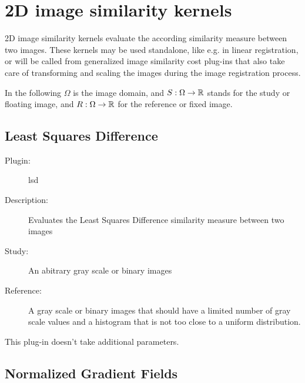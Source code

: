 \section{2D image similarity kernels}  \label{sec:cost2d}
  
  2D image similarity kernels evaluate the according similarity measure between 
  two images. These kernels may be used standalone, like e.g. in linear registration, 
  or will be called from generalized image similarity cost plug-ins that also take 
  care of transforming and scaling the images during the image registration process. 

  In the following $\Omega$ is the image domain, and $S:\Omega\rightarrow \mathbb{R}$ stands  
  for the study or floating image, and  $R:\Omega\rightarrow \mathbb{R}$ for the reference or fixed image. 

   
   \subsection{Least Squares Difference}
   \label{cost2d:lsd}
   
   \begin{description}
   
   \item [Plugin:] lsd
   \item [Description:] Evaluates the Least Squares Difference similarity measure between two images 
   \cite{heldmann10lsd}
   \item [Study:] An abitrary gray scale or binary images 
   \item [Reference:] A gray scale or binary images that should have a limited number of gray scale values 
                 and a histogram that is not too close to a uniform distribution. 
   \end{description}
   
   This plug-in doesn't take additional parameters. 

   
   \subsection{Normalized Gradient Fields}
   \label{cost2d:ngf}
   
